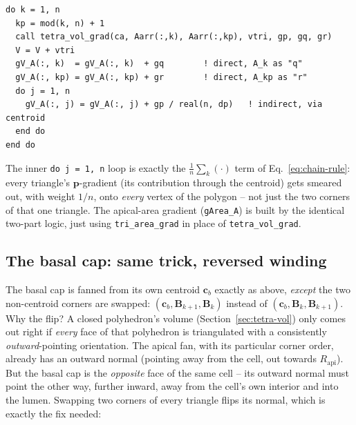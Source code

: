 \documentclass[11pt,a4paper]{report}
\newcommand{\pvec}{\mathbf{p}}
\newcommand{\Barr}{\mathbf{B}}
\newcommand{\cb}{\mathbf{c}_b}
\begin{document}
\begin{lstlisting}
do k = 1, n
  kp = mod(k, n) + 1
  call tetra_vol_grad(ca, Aarr(:,k), Aarr(:,kp), vtri, gp, gq, gr)
  V = V + vtri
  gV_A(:, k)  = gV_A(:, k)  + gq        ! direct, A_k as "q"
  gV_A(:, kp) = gV_A(:, kp) + gr        ! direct, A_kp as "r"
  do j = 1, n
    gV_A(:, j) = gV_A(:, j) + gp / real(n, dp)   ! indirect, via centroid
  end do
end do
\end{lstlisting}
The inner \texttt{do j = 1, n} loop is exactly the $\tfrac1n\sum_k(\cdot)$
term of Eq.~\ref{eq:chain-rule}: every triangle's $\pvec$-gradient
(its contribution through the centroid) gets smeared out, with weight
$1/n$, onto \emph{every} vertex of the polygon -- not just the two
corners of that one triangle. The apical-area gradient
(\texttt{gArea\_A}) is built by the identical two-part logic, just
using \texttt{tri\_area\_grad} in place of \texttt{tetra\_vol\_grad}.

\subsection{The basal cap: same trick, reversed winding}
\label{sec:basal-reverse}
The basal cap is fanned from its own centroid $\cb$ exactly as above,
\emph{except} the two non-centroid corners are swapped:
$(\cb,\Barr_{k+1},\Barr_k)$ instead of $(\cb,\Barr_k,\Barr_{k+1})$. Why
the flip? A closed polyhedron's volume (Section~\ref{sec:tetra-vol})
only comes out right if \emph{every} face of that polyhedron is
triangulated with a consistently \emph{outward}-pointing orientation.
The apical fan, with its particular corner order, already has an
outward normal (pointing away from the cell, out towards $R_{\mathrm{api}}$).
But the basal cap is the \emph{opposite} face of the same cell -- its
outward normal must point the other way, further inward, away from the
cell's own interior and into the lumen. Swapping two corners of every
triangle flips its normal, which is exactly the fix needed:
\end{document}
